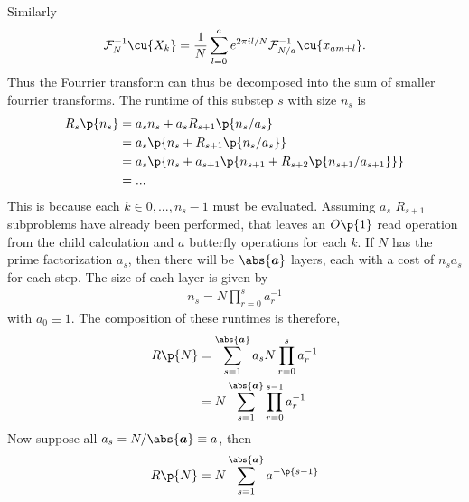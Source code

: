 \documentclass[11pt, a4paper]{article}
\begin{document}
Similarly
\begin{equation}\begin{aligned}
    \mathcal{F}^{-1}_{N} \cu{X_{k}} = \frac{1}{N} \sum_{l=0}^{a} e^{2 \pi i l /N} \mathcal{F}_{N/a}^{-1} \cu{x_{am + l}}.
\end{aligned}\end{equation}
Thus the Fourrier transform can thus be decomposed into the sum of smaller fourrier transforms.
The runtime of this substep $s$ with size $n_{s}$ is
\begin{equation}\begin{aligned}
    R_{s}\p{n_{s}} &= a_{s} n_{s} + a_{s}R_{s+1} \p{n_{s}/a_{s}} \\
    &= a_{s} \p{n_{s} + R_{s+1}\p{n_{s}/a_{s}}} \\
    &= a_{s}\p{n_{s} + a_{s+1} \p{n_{s+1} + R_{s+2}\p{n_{s+1}/a_{s+1}}}} \\
    &= ...
\end{aligned}\end{equation}
This is because each $k \in 0, ..., n_{s}-1$ must be evaluated. Assuming $a_{s}$ $R_{s+1}$ subproblems have already been performed,
that leaves an $O\p{1}$ read operation from the child calculation and $a$ butterfly operations for each $k$.
If $N$ has the prime factorization $a_{s}$, then there will be $\abs{\vec{a}}$ layers, each with a cost of
$n_{s}a_{s}$ for each step. The size of each layer is given by
\begin{equation}\begin{aligned}
    n_{s} = N \prod_{r=0}^{s} a_{r}^{-1}
\end{aligned}\end{equation}
with $a_{0} \equiv 1$.
The composition of these runtimes is therefore,
\begin{equation}\begin{aligned}
    R\p{N} &= \sum_{s=1}^{\abs{\vec{a}}} a_{s} N \prod_{r=0}^{s} a_{r}^{-1} \\
    &= N \sum_{s=1}^{\abs{\vec{a}}} \prod_{r=0}^{s-1} a_{r}^{-1} \\
\end{aligned}\end{equation}
Now suppose all $a_{s} = N/\abs{\vec{a}}\equiv a$,
then
\begin{equation}\begin{aligned}
    R\p{N} = N \sum_{s=1}^{\abs{\vec{a}}} a^{-\p{s-1}}
\end{aligned}\end{equation}
\end{document}
